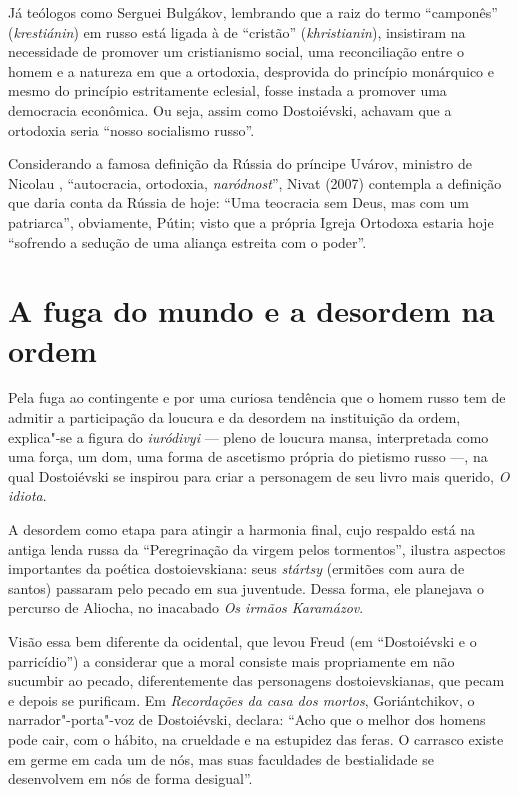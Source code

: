 Já teólogos como Serguei Bulgákov, lembrando que a raiz do termo ``camponês'' (\emph{krestiánin}) em russo está ligada à de ``cristão'' (\emph{khristianin}), insistiram na necessidade de promover um cristianismo social, uma reconciliação entre o homem e a natureza em que a ortodoxia, desprovida do princípio monárquico e mesmo do princípio estritamente eclesial, fosse instada a promover uma democracia econômica. Ou seja, assim como Dostoiévski, achavam que a ortodoxia seria ``nosso socialismo russo''.

Considerando a famosa definição da Rússia do príncipe Uvárov, ministro de Nicolau , ``autocracia, ortodoxia, \emph{naródnost}'', Nivat (2007) contempla a definição que daria conta da Rússia de hoje: ``Uma teocracia sem Deus, mas com um patriarca'', obviamente, Pútin; visto que a própria Igreja Ortodoxa estaria hoje ``sofrendo a sedução de uma aliança estreita com o poder''.

\section{\uppercase{A} fuga do mundo e a desordem na ordem}

Pela fuga ao contingente e por uma curiosa tendência que o homem russo
tem de admitir a participação da loucura e da desordem na instituição da
ordem, explica"-se a figura do \emph{iuródivyi} --- pleno de loucura mansa,
interpretada como uma força, um dom, uma forma de ascetismo própria do
pietismo russo ---, na qual Dostoiévski se inspirou para criar a
personagem de seu livro mais querido, \emph{O idiota}.

A desordem como etapa para atingir a harmonia final, cujo respaldo está na antiga lenda russa da ``Peregrinação da virgem pelos tormentos'', ilustra aspectos importantes da poética dostoievskiana: seus \emph{stártsy} (ermitões com aura de santos) passaram pelo pecado em sua juventude. Dessa forma, ele planejava o percurso de Aliocha, no inacabado \emph{Os irmãos Karamázov}.

Visão essa bem diferente da ocidental, que levou Freud
(em ``Dostoiévski e o parricídio'') a considerar que a moral consiste
mais propriamente em não sucumbir ao pecado, diferentemente das
personagens dostoievskianas, que pecam e depois se purificam.
Em \emph{Recordações da casa dos mortos}, Goriántchikov, o
narrador"-porta"-voz de Dostoiévski, declara: ``Acho que o melhor dos
homens pode cair, com o hábito, na crueldade e na estupidez das feras. O carrasco existe em germe em cada um de nós, mas suas faculdades de bestialidade se desenvolvem em nós de forma desigual''.

